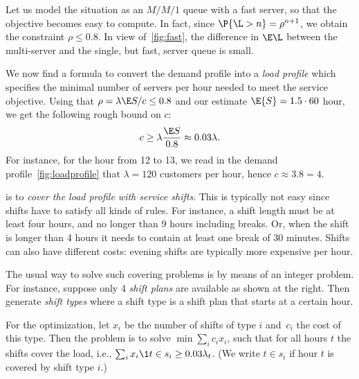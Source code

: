 Let us model the situation as an $M/M/1$ queue with a fast server, so that the objective becomes easy to compute.
In fact, since $\P{\L>n} = \rho^{n+1}$, we obtain the constraint $\rho\leq 0.8$.
In view of~\cref{fig:fast}, the difference in $\E \L$ between the multi-server and the single, but fast, server queue is small.


We now find a formula to convert the demand profile into a \emph{load profile} which specifies the minimal number of servers per hour needed to meet the service objective.
Using that $\rho = \lambda \E S/c \leq 0.8 $ and our estimate $\E{S}=1.5\cdot 60$ hour, we get the following rough bound on $c$:
\begin{equation*}
c \geq \lambda \frac{\E S}{0.8} \approx 0.03 \lambda.
\end{equation*}
For instance, for the hour from 12 to 13, we read in the demand profile~\cref{fig:loadprofile} that $\lambda= 120$ customers per hour, hence $c\approx 3.8 = 4$.

 is to \emph{cover the load profile with service shifts}.
This is typically not easy since shifts have to satisfy all kinds of rules.
For instance, a shift length must be at least four hours, and no longer than 9 hours including breaks.
Or, when the shift is longer than 4 hours it needs to contain at least one break of 30 minutes.
Shifts can also have different costs: evening shifts are typically  more expensive per hour.

The usual way to solve such covering problems is by means of an integer
problem. For instance, suppose only 4 \emph{shift plans} are available as shown at the right.
Then generate \emph{shift types} where a shift type is a shift plan that starts at a certain hour.

For the optimization, let $x_i$ be the number of shifts of type $i$ and~$c_i$ the cost of this type.
Then the problem is to solve $\min \sum_i c_i x_i$,
such that for all hours $t$ the shifts cover the load, i.e., $\sum_i x_i \1{t \in s_i} \geq 0.03 \lambda_t$.
(We write $t\in s_i$ if hour $t$ is covered by shift type $i$.)


